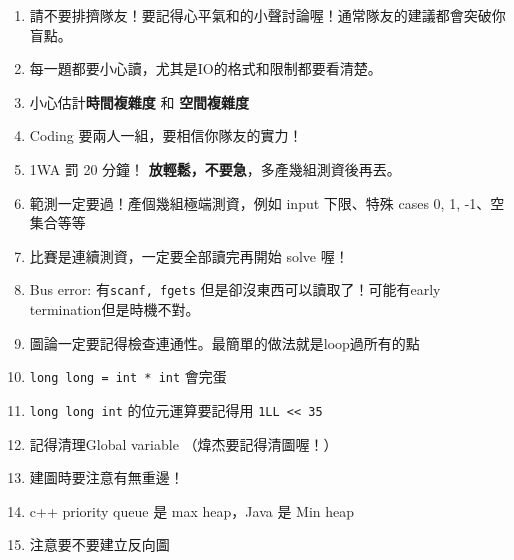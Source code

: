 \documentclass[10pt,oneside]{article}
\begin{document}
\begin{landscape}
\begin{multicols}{2}
{\normalsize
\begin{enumerate}
\item 請不要排擠隊友！要記得心平氣和的小聲討論喔！通常隊友的建議都會突破你盲點。
\item 每一題都要小心讀，尤其是IO的格式和限制都要看清楚。%
\item 小心估計\textbf{時間複雜度} 和 \textbf{空間複雜度}%
\item Coding 要兩人一組，要相信你隊友的實力！
\item 1WA 罰 20 分鐘！ \textbf{放輕鬆，不要急}，多產幾組測資後再丟。%
\item 範測一定要過！產個幾組極端測資，例如 input 下限、特殊 cases 0, 1, -1、空集合等等 %
\item 比賽是連續測資，一定要全部讀完再開始 solve 喔！%
\item Bus error: 有\texttt{scanf, fgets} 但是卻沒東西可以讀取了！可能有early termination但是時機不對。 %
\item 圖論一定要記得檢查連通性。最簡單的做法就是loop過所有的點%
\item \texttt{long long = int * int} 會完蛋%
\item \texttt{long long int} 的位元運算要記得用 \texttt{1LL << 35} %
\item 記得清理Global variable （煒杰要記得清圖喔！）
\item 建圖時要注意有無重邊！
\item c++ priority queue 是 max heap，Java 是 Min heap
\item 注意要不要建立反向圖 %
\end{enumerate}
}


\end{multicols}
\end{landscape}
\end{document}
